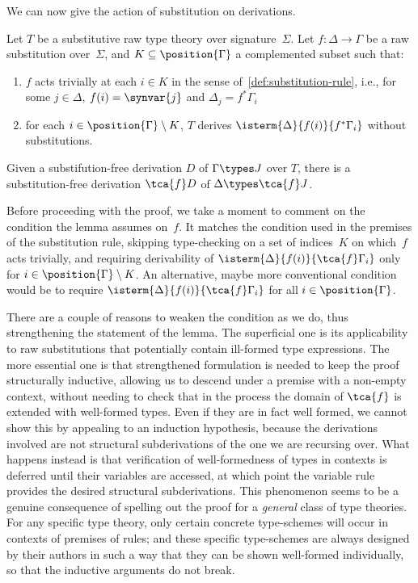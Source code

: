 We can now give the action of substitution on derivations.

\begin{lemma}%
  \label{lem:admissibility-substitution}%
  Let $T$ be a substitutive raw type theory over signature~$\Sigma$.
  Let $f : \Delta \to \Gamma$ be a raw substitution over~$\Sigma$, and $K \subseteq \position{\Gamma}$ a complemented subset such that:
  \begin{enumerate}
  \item \label{item:subst-trivial-case} $f$ acts trivially at each $i \in K$ in the sense of~\cref{def:substitution-rule}, i.e., for some $j \in \Delta$, $f(i) = \synvar{j}$ and $\Delta_j = f^*\Gamma_i$
  \item \label{item:subst-nontrivial-case} for each $i \in \position{\Gamma} \setminus K$, $T$ derives $\isterm{\Delta}{f(i)}{f^*\Gamma_i}$ without substitutions.
  \end{enumerate}
  Given a substifution-free derivation $D$ of $\Gamma \types J$ over $T$, there is a substitution-free derivation $\tca{f}D$ of $\Delta \types \tca{f} J$.
\end{lemma}

Before proceeding with the proof, we take a moment to comment on the condition the lemma assumes on~$f$. It matches the condition used in the premises of the substitution rule, skipping type-checking on a set of indices~$K$ on which~$f$ acts trivially, and requiring derivability of $\isterm{\Delta}{f(i)}{\tca{f} \Gamma_i}$ only for $i \in \position{\Gamma} \setminus K$.
%
An alternative, maybe more conventional condition would be to require $\isterm{\Delta}{f(i)}{\tca{f} \Gamma_i}$ for all $i \in \position{\Gamma}$.

There are a couple of reasons to weaken the condition as we do, thus strengthening the statement of the lemma. The superficial one is its applicability to raw substitutions that potentially contain ill-formed type expressions.
%
The more essential one is that strengthened formulation is needed to keep the proof structurally inductive, allowing us to descend under a premise with a non-empty context, without needing to check that in the process the domain of $\tca{f}$ is extended with well-formed types.
%
Even if they are in fact well formed, we cannot show this by appealing to an induction hypothesis, because the derivations involved are not structural subderivations of the one we are recursing over.
%
What happens instead is that verification of well-formedness of types in contexts is deferred until their variables are accessed, at which point the variable rule provides the desired structural subderivations.
%
This phenomenon seems to be a genuine consequence of spelling out the proof for a \emph{general} class of type theories.
%
For any specific type theory, only certain concrete type-schemes will occur in contexts of premises of rules; and
these specific type-schemes are always designed by their authors in such a way that they can be shown well-formed individually, so that the inductive arguments do not break.

